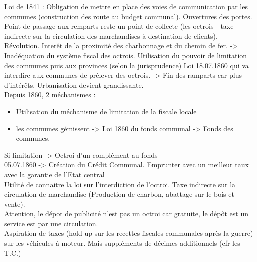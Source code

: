 \documentclass{book}
\begin{document}
\null


Loi de 1841 : Obligation de mettre en place des voies de communication par les communes (construction des route au budget communal). Ouvertures des portes. Point de passage aux remparts reste un point de collecte (les octrois - taxe indirecte sur la circulation des marchandises à destination de clients).\\

Révolution. Interêt de la proximité des charbonnage et du chemin de fer. -> Inadéquation du système fiscal des octrois. Utilisation du pouvoir de limitation des communes puis aux provinces (selon la jurisprudence) Loi 18.07.1860 qui va interdire aux communes de prélever des octrois. -> Fin des ramparts car plus d'intérêts. Urbanisation devient grandissante. \\

Depuis 1860, 2 méchanismes :\\


\begin{itemize}
\item Utilisation du méchanisme de limitation de la fiscale locale
\item les communes gémissent -> Loi 1860 du fonds communal -> Fonds des communes. 
\end{itemize}
\null

Si limitation -> Octroi d'un complément au fonds\\

05.07.1860 -> Création du Crédit Communal. Emprunter avec un meilleur taux avec la garantie de l'Etat central\\

Utilité de connaitre la loi sur l'interdiction de l'octroi. Taxe indirecte sur la circulation de marchandise (Production de charbon, abattage sur le bois et vente).\\

Attention, le dépot de publicité n'est pas un octroi car gratuite, le dépôt est un service est par une circulation.\\

Aspiration de taxes (hold-up sur les recettes fiscales communales après la guerre) sur les véhicules à moteur. Mais suppléments de décimes additionnels (cfr les T.C.)\\




















\nocite{*}

\end{document}
